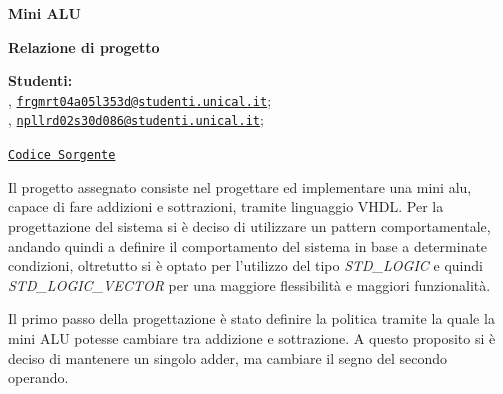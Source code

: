 



\usepackage{listings}
\usepackage{xcolor}





\begin{Large}
    \textsf{\textbf{Mini ALU}}\\
\end{Large}
\textbf{Relazione di progetto}

\vspace{1ex}

\textsf{\textbf{Studenti:}} \\
, \href{frgmrt04a05l353d@studenti.unical.it}{\texttt{frgmrt04a05l353d@studenti.unical.it}};\\
, \href{npllrd02s30d086@studenti.unical.it} {\texttt{npllrd02s30d086@studenti.unical.it}};

\href{https://github.com/Zi0LEO/elettronica_digitale}{\texttt{Codice Sorgente}}


\vspace{2ex}

Il progetto assegnato consiste nel progettare ed implementare una mini alu, capace di fare addizioni e sottrazioni, tramite linguaggio VHDL.
Per la progettazione del sistema si è deciso di utilizzare un pattern comportamentale, andando quindi a definire il comportamento del sistema in base a determinate condizioni, oltretutto si è optato per l'utilizzo del tipo \textit{STD\_LOGIC} e quindi \textit{STD\_LOGIC\_VECTOR} per una maggiore flessibilità e maggiori funzionalità.

Il primo passo della progettazione è stato definire la politica tramite la quale la mini ALU potesse cambiare tra addizione e sottrazione. A questo proposito si è deciso di mantenere un singolo adder, ma cambiare
il segno del secondo operando.

